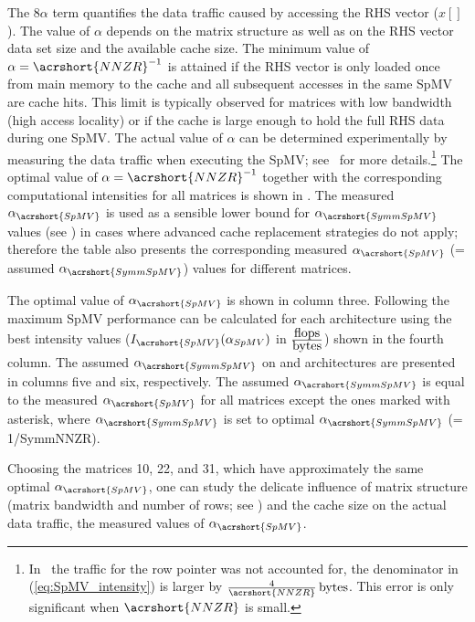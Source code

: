 The $8\alpha$ term quantifies the data traffic caused by accessing the
RHS vector ($x[]$). The value of $\alpha$ depends on
the matrix structure as well as on the RHS vector data set size and
the available cache size. The minimum value of
$\alpha=\acrshort{NNZR}^{-1}$ is attained if the RHS vector is only
loaded once from main memory to the cache and all subsequent accesses
in the same \acrshort{SpMV} are cache hits. This limit is typically
observed for matrices with low bandwidth (high access locality) or if
the cache is large enough to hold the full RHS data during
one \acrshort{SpMV}. The actual value of $\alpha$ can be determined
experimentally by measuring the data traffic when executing
the \acrshort{SpMV}; see~\cite{Moritz_sell} for more
details.\footnote{In~\cite{Moritz_sell} the traffic for the row
pointer was not accounted for, \ie the denominator in
(\ref{eq:SpMV_intensity}) is larger by
$\frac{4}{\acrshort{NNZR}}\,\BYTE$. This error is only significant
when $\acrshort{NNZR}$ is small.}  The optimal value of
$\alpha=\acrshort{NNZR}^{-1}$ together with the corresponding
computational intensities for all matrices is shown in 
. The measured $\alpha_{\acrshort{SpMV}}$
 is used as a sensible lower bound for $\alpha_{\acrshort{SymmSpMV}}$ 
 values (see ) in cases where advanced cache
 replacement strategies  do not apply; therefore the table also presents the 
 corresponding measured $\alpha_{\acrshort{SpMV}}$ (= assumed $\alpha_{\acrshort{SymmSpMV}}$)
values for different matrices.
\begin{table}[t]
	\centering
	\caption{The optimal value of $\alpha_{\acrshort{SpMV}}$
	is shown in column three. Following  the
	maximum \acrshort{SpMV} performance can be calculated for each
	architecture using the best intensity values
	($I_{\acrshort{SpMV}}(\alpha_{SpMV})$ in
	$\frac{\mbox{flops}}{\mbox{bytes}}$) shown in the fourth
	column. The assumed $\alpha_{\acrshort{SymmSpMV}}$ on \SKX and 
	\IVB architectures are presented in columns five and six, respectively.
	The assumed $\alpha_{\acrshort{SymmSpMV}}$ is equal to 
	the measured $\alpha_{\acrshort{SpMV}}$ for all matrices
	except the ones marked with asterisk, where  $\alpha_{\acrshort{SymmSpMV}}$
	is set to optimal $\alpha_{\acrshort{SymmSpMV}}$ (= 1/\acrshort{SymmNNZR}).
	 \label{table:alpha_values}}
    \begin{center} 
      
    \end{center}
\end{table}
Choosing the matrices 10, 22, and 31, which have approximately the
same optimal $\alpha_{\acrshort{SpMV}}$, one can study the delicate
influence of matrix structure (\ie matrix bandwidth and number of
rows; see ) and the cache size on the actual data
traffic, \ie the measured values of $\alpha_{\acrshort{SpMV}}$.
 
